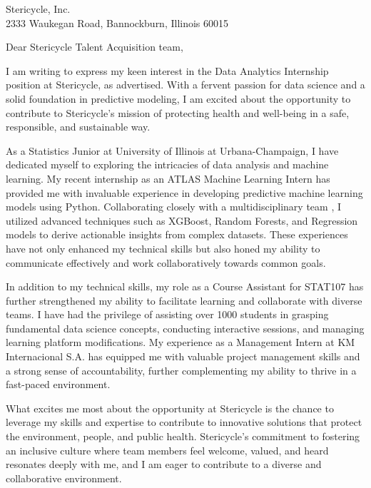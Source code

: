\documentclass{letter}
\begin{document}
\begin{letter}{Stericycle, Inc.\\
2333 Waukegan Road, Bannockburn, Illinois 60015}


\opening{Dear Stericycle Talent Acquisition team,}

I am writing to express my keen interest in the Data Analytics 
Internship position at Stericycle, as advertised. With a fervent
 passion for data science and a solid foundation in predictive 
 modeling, I am excited about the opportunity to contribute to 
 Stericycle's mission of protecting health and well-being in a 
 safe, responsible, and sustainable way.

As a Statistics Junior at University of Illinois at Urbana-Champaign, 
I have dedicated myself
 to exploring the intricacies of data analysis and machine learning. 
 My recent internship as an ATLAS Machine Learning Intern has provided 
 me with invaluable experience in developing predictive machine learning 
 models using Python. Collaborating closely with a multidisciplinary team
 , I utilized advanced techniques such as XGBoost, Random Forests, and 
 Regression models to derive actionable insights from complex datasets. 
 These experiences have not only enhanced my technical skills but also
  honed my ability to communicate effectively and work collaboratively 
  towards common goals.

In addition to my technical skills, my role as a Course Assistant
 for STAT107 has further strengthened my ability to facilitate
  learning and collaborate with diverse teams. I have had the 
  privilege of assisting over 1000 students in grasping fundamental
   data science concepts, conducting interactive sessions, and managing
    learning platform modifications. My experience as a Management Intern 
    at KM Internacional S.A. has equipped me with valuable project management
     skills and a strong sense of accountability, further complementing my 
     ability to thrive in a fast-paced environment.

What excites me most about the opportunity at Stericycle is
 the chance to leverage my skills and expertise to contribute to
  innovative solutions that protect the environment, people, and 
  public health. Stericycle's commitment to fostering an inclusive 
  culture where team members feel welcome, valued, and heard resonates 
  deeply with me, and I am eager to contribute to a diverse and 
  collaborative environment.


\end{letter}
\end{document}

